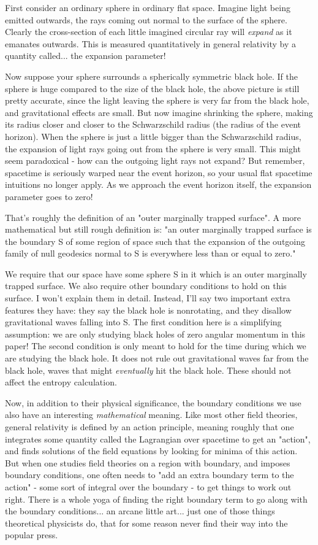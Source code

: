 First consider an ordinary sphere in ordinary flat space.  Imagine light
being emitted outwards, the rays coming out normal to the surface of the
sphere.  Clearly the cross-section of each little imagined circular ray
will \emph{expand} as it emanates outwards.  This is measured quantitatively
in general relativity by a quantity called... the expansion parameter!

Now suppose your sphere surrounds a spherically symmetric black hole.
If the sphere is huge compared to the size of the black hole, the above
picture is still pretty accurate, since the light leaving the sphere is
very far from the black hole, and gravitational effects are small.  But
now imagine shrinking the sphere, making its radius closer and closer to
the Schwarzschild radius (the radius of the event horizon).  When the
sphere is just a little bigger than the Schwarzschild radius, the
expansion of light rays going out from the sphere is very small.  This
might seem paradoxical - how can the outgoing light rays not expand?
But remember, spacetime is seriously warped near the event horizon, so
your usual flat spacetime intuitions no longer apply.  As we approach
the event horizon itself, the expansion parameter goes to zero!

That's roughly the definition of an "outer marginally trapped surface".
A more mathematical but still rough definition is: "an outer marginally
trapped surface is the boundary S of some region of space such that the
expansion of the outgoing family of null geodesics normal to S is
everywhere less than or equal to zero."

We require that our space have some sphere S in it which is an outer
marginally trapped surface.  We also require other boundary conditions
to hold on this surface.  I won't explain them in detail.  Instead, I'll
say two important extra features they have: they say the black hole is
nonrotating, and they disallow gravitational waves falling into S.  The
first condition here is a simplifying assumption: we are only studying
black holes of zero angular momentum in this paper!  The second
condition is only meant to hold for the time during which we are
studying the black hole.  It does not rule out gravitational waves far
from the black hole, waves that might \emph{eventually} hit the black hole.
These should not affect the entropy calculation.

Now, in addition to their physical significance, the boundary conditions
we use also have an interesting \emph{mathematical} meaning.  Like most other
field theories, general relativity is defined by an action principle,
meaning roughly that one integrates some quantity called the Lagrangian
over spacetime to get an "action", and finds solutions of the field
equations by looking for minima of this action.  But when one studies
field theories on a region with boundary, and imposes boundary
conditions, one often needs to "add an extra boundary term to the
action" - some sort of integral over the boundary - to get things to
work out right.  There is a whole yoga of finding the right boundary
term to go along with the boundary conditions... an arcane little art...
just one of those things theoretical physicists do, that for some reason
never find their way into the popular press.

